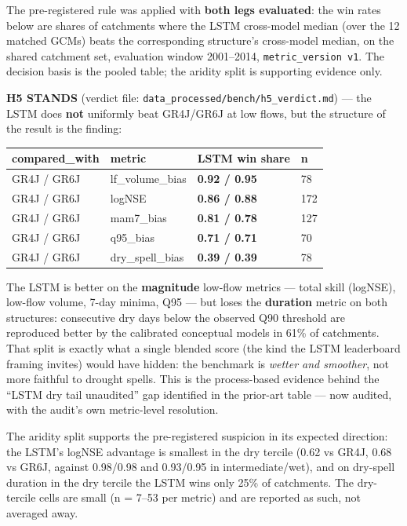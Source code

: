 \documentclass[
  english,
  11pt,
]{article}
\newcounter{none} %
\begin{document}
The pre-registered rule was applied with \textbf{both legs evaluated}:
the win rates below are shares of catchments where the LSTM cross-model
median (over the 12 matched GCMs) beats the corresponding structure's
cross-model median, on the shared catchment set, evaluation window
2001--2014, \texttt{metric\_version\ v1}. The decision basis is the
pooled table; the aridity split is supporting evidence only.

\textbf{H5 STANDS} (verdict file:
\texttt{data\_processed/bench/h5\_verdict.md}) --- the LSTM does
\textbf{not} uniformly beat GR4J/GR6J at low flows, but the structure of
the result is the finding:

{\def\LTcaptype{none} %
\begin{longtable}[]{@{}llll@{}}
\toprule\noalign{}
compared\_with & metric & LSTM win share & n \\
\midrule\noalign{}
\endhead
\bottomrule\noalign{}
\endlastfoot
GR4J / GR6J & lf\_volume\_bias & \textbf{0.92 / 0.95} & 78 \\
GR4J / GR6J & logNSE & \textbf{0.86 / 0.88} & 172 \\
GR4J / GR6J & mam7\_bias & \textbf{0.81 / 0.78} & 127 \\
GR4J / GR6J & q95\_bias & \textbf{0.71 / 0.71} & 70 \\
GR4J / GR6J & dry\_spell\_bias & \textbf{0.39 / 0.39} & 78 \\
\end{longtable}
}

The LSTM is better on the \textbf{magnitude} low-flow metrics --- total
skill (logNSE), low-flow volume, 7-day minima, Q95 --- but loses the
\textbf{duration} metric on both structures: consecutive dry days below
the observed Q90 threshold are reproduced better by the calibrated
conceptual models in 61\% of catchments. That split is exactly what a
single blended score (the kind the LSTM leaderboard framing invites)
would have hidden: the benchmark is \emph{wetter and smoother}, not more
faithful to drought spells. This is the process-based evidence behind
the ``LSTM dry tail unaudited'' gap identified in the prior-art table
--- now audited, with the audit's own metric-level resolution.

The aridity split supports the pre-registered suspicion in its expected
direction: the LSTM's logNSE advantage is smallest in the dry tercile
(0.62 vs GR4J, 0.68 vs GR6J, against 0.98/0.98 and 0.93/0.95 in
intermediate/wet), and on dry-spell duration in the dry tercile the LSTM
wins only 25\% of catchments. The dry-tercile cells are small (n = 7--53
per metric) and are reported as such, not averaged away.
\end{document}
